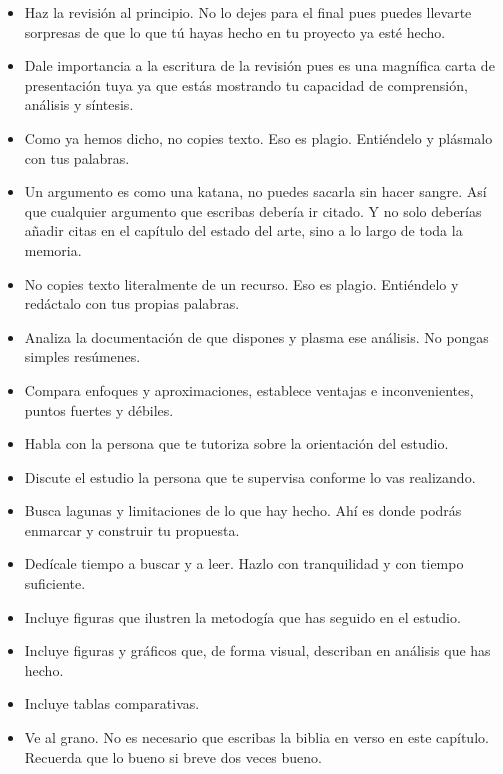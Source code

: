 \begin{itemize}
    \item Haz la revisión al principio. No lo dejes para el final pues puedes llevarte sorpresas de que lo que tú hayas hecho en tu proyecto ya esté hecho.
    \item Dale importancia a la escritura de la revisión pues es una magnífica carta de presentación tuya ya que estás mostrando tu capacidad de comprensión, análisis y síntesis.
    \item Como ya hemos dicho, no copies texto. Eso es plagio. Entiéndelo y plásmalo con tus palabras.
    \item Un argumento es como una katana, no puedes sacarla sin hacer sangre. Así que cualquier argumento que escribas debería ir citado. Y no solo deberías añadir citas en el capítulo del estado del arte, sino a lo largo de toda la memoria.
    \item No copies texto literalmente de un recurso. Eso es plagio. Entiéndelo y redáctalo con tus propias palabras.
    \item Analiza la documentación de que dispones y plasma ese análisis. No pongas simples resúmenes.
    \item Compara enfoques y aproximaciones, establece ventajas e inconvenientes, puntos fuertes y débiles.
    \item Habla con la persona que te tutoriza sobre la orientación del estudio. 
    \item Discute el estudio la persona que te supervisa conforme lo vas realizando.
    \item Busca lagunas y limitaciones de lo que hay hecho. Ahí es donde podrás enmarcar y construir tu propuesta.
    \item Dedícale tiempo a buscar y a leer. Hazlo con tranquilidad y con tiempo suficiente.  
    \item Incluye figuras que ilustren la metodogía que has seguido en el estudio.
    \item Incluye figuras y gráficos que, de forma visual, describan en análisis que has hecho.
    \item Incluye tablas comparativas.
    \item Ve al grano. No es necesario que escribas la biblia en verso en este capítulo. Recuerda que lo bueno si breve dos veces bueno.
\end{itemize}
